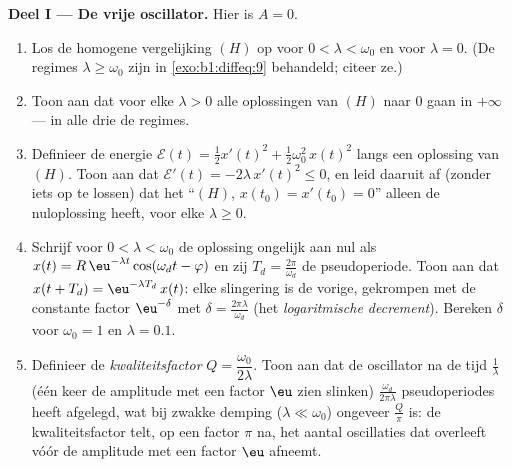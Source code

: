 \begin{problem}
\medskip
\noindent\textbf{Deel I --- De vrije oscillator.} Hier is $A = 0$.
\begin{enumerate}
  \item Los de homogene vergelijking $(H)$ op voor $0 < \lambda <
        \omega_0$ en voor $\lambda = 0$. (De regimes $\lambda \geq
        \omega_0$ zijn in \cref{exo:b1:diffeq:9} behandeld; citeer ze.)
  \item Toon aan dat voor elke $\lambda > 0$ alle oplossingen van $(H)$
        naar $0$ gaan in $+\infty$ --- in alle drie de regimes.
  \item Definieer de energie $\mathcal E(t) = \frac12 x'(t)^2 +
        \frac12\omega_0^2\,x(t)^2$ langs een oplossing van $(H)$. Toon
        aan dat $\mathcal E'(t) = -2\lambda\,x'(t)^2 \leq 0$, en leid
        daaruit af (zonder iets op te lossen) dat het 
        ``$(H)$, $x(t_0) = x'(t_0) = 0$'' alleen de nuloplossing heeft,
        voor elke $\lambda \geq 0$.
  \item Schrijf voor $0 < \lambda < \omega_0$ de oplossing ongelijk aan
        nul als $x(t) = R\,\eu^{-\lambda t}\cos(\omega_d t - \varphi)$
        en zij $T_d = \frac{2\pi}{\omega_d}$ de pseudoperiode. Toon aan
        dat $x(t + T_d) = \eu^{-\lambda T_d}\,x(t)$: elke slingering is
        de vorige, gekrompen met de constante factor $\eu^{-\delta}$
        met $\delta = \frac{2\pi\lambda}{\omega_d}$ (het
        \emph{logaritmische decrement}). Bereken $\delta$ voor
        $\omega_0 = 1$ en $\lambda = 0.1$.
  \item Definieer de \emph{kwaliteitsfactor} $Q =
        \dfrac{\omega_0}{2\lambda}$. Toon aan
        dat de oscillator na de tijd $\frac1\lambda$ (één keer de
        amplitude met een factor $\eu$ zien slinken)
        $\frac{\omega_d}{2\pi\lambda}$ pseudoperiodes heeft afgelegd,
        wat bij zwakke demping ($\lambda \ll \omega_0$) ongeveer
        $\frac Q\pi$ is: de kwaliteitsfactor telt, op een factor $\pi$
        na, het aantal oscillaties dat overleeft vóór de amplitude met
        een factor $\eu$ afneemt.
\end{enumerate}


\end{problem}
